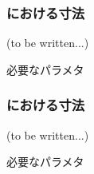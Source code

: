 \subsubsection{\EndFaceBoringMilling における寸法\TBW}
(to be written...)
\begin{Parameter}{必要なパラメタ}
\PMEndFaceBoringWidth
\PMEndFaceBoringCornerR
\PMEndFaceBoringDepth
\PMEndFaceBoringLength\\
\PMACOD
\PMBDOD
\end{Parameter}

\subsubsection{\IncutBoringMilling における寸法\TBW}
(to be written...)
\begin{Parameter}{必要なパラメタ}
\PMIncutBoringACWidth
\PMIncutBoringBDWidth
\PMIncutBoringCornerR
\PMIncutBoringLength
\end{Parameter}


\clearpage
